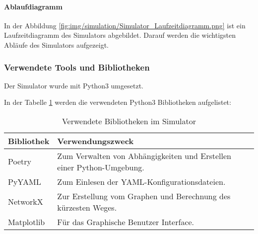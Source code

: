 \documentclass[../main.tex]{subfiles}
\begin{document}
\paragraph{Ablaufdiagramm}
In der Abbildung \ref{fig:img/simulation/Simulator_Laufzeitdiagramm.png} ist ein Laufzeitdiagramm des Simulators abgebildet. Darauf werden die wichtigsten Abläufe des Simulators aufgezeigt. 


\subsubsection{Verwendete Tools und Bibliotheken}

Der Simulator wurde mit Python3 umgesetzt.

In der Tabelle \ref{tab:simulator_bibliotheken} werden die verwendeten Python3 Bibliotheken aufgelistet:

\begin{table}[htbp!]
    \centering
    \begin{tabularx}{\textwidth}{| l | X |}
        \hline
        \textbf{Bibliothek} & \textbf{Verwendungszweck} \\ \hline
        Poetry & Zum Verwalten von Abhängigkeiten und Erstellen einer Python-Umgebung. \\ \hline
        PyYAML & Zum Einlesen der YAML-Konfigurationsdateien. \\ \hline
        NetworkX & Zur Erstellung vom Graphen und Berechnung des kürzesten Weges. \\ \hline
        Matplotlib & Für das Graphische Benutzer Interface. \\ \hline
    \end{tabularx}
    \label{tab:simulator_bibliotheken}
    \caption{Verwendete Bibliotheken im Simulator}
\end{table}
\end{document}
